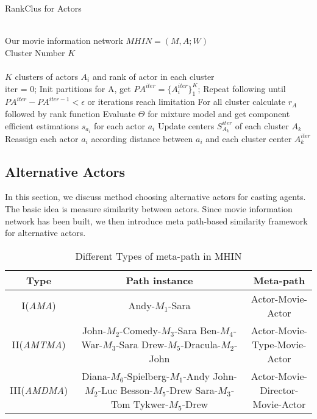 \begin{algorithm}[htb]
\renewcommand{\algorithmicrequire}{\textbf{Input:}}
\renewcommand\algorithmicensure {\textbf{Output:} }
\caption{RankClus for Actors}

\begin{algorithmic}[1]

\REQUIRE ~~\\
Our movie information network $MHIN=(M, A; W)$\\
Cluster Number $K$\\

\ENSURE ~~\\
$K$ clusters of actors $A_i$ and rank of actor in each cluster \\
\STATE iter = 0;
\STATE Init partitions for A, get $PA^{iter}=\{A_i^{iter}\}_1^K$;
\STATE Repeat following until $PA^{iter}-PA^{iter-1}<\epsilon$ or iterations reach limitation
\STATE \quad For all cluster calculate $r_A$ followed by rank function
\STATE \quad Evaluate $\Theta$ for mixture model and get component efficient estimations $s_{a_i}$ for each actor $a_i$
\STATE \quad Update centers $S_{A_k}^{iter}$ of each cluster $A_k$
\STATE \quad Reassign each actor $a_i$ according distance between $a_i$ and each cluster center $A_k^{iter}$
\end{algorithmic}
\end{algorithm}


\subsection{Alternative Actors}
In this section, we discuss method choosing alternative actors for casting agents. The basic idea is measure similarity between actors. Since movie information network has been built, we then introduce meta path-based similarity framework for alternative actors.

\begin{table}[!htb]
  \centering
  \begin{tabular}{c|c|c}
  \hline
  Type & Path instance & Meta-path \\
  \hline
  I(\emph{AMA})& Andy-$M_1$-Sara & Actor-Movie-Actor  \\
  \hline
  II(\emph{AMTMA}) & \tabincell{c}{John-$M_2$-Comedy-$M_3$-Sara\\Ben-$M_4$-War-$M_3$-Sara\\Drew-$M_5$-Dracula-$M_2$-John} & \tabincell{c}{Actor-Movie-\\Type-Movie-Actor} \\
  \hline
  III(\emph{AMDMA}) & \tabincell{c}{Diana-$M_6$-Spielberg-$M_1$-Andy\\John-$M_2$-Luc Besson-$M_5$-Drew\\Sara-$M_3$-Tom Tykwer-$M_5$-Drew} & \tabincell{c}{Actor-Movie-\\Director-Movie-Actor}\\
  \hline
  \end{tabular}
  \caption{Different Types of meta-path in MHIN}\label{tab:metapath}
\end{table}


